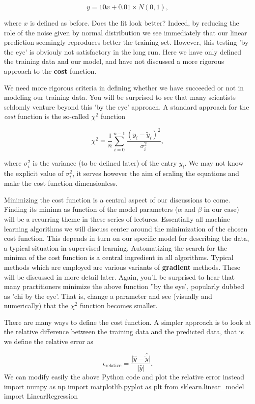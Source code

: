 \documentclass[%
oneside,                 %
final,                   %
10pt]{article}
\begin{document}
\[
y = 10x+0.01 \times N(0,1),
\]

where $x$ is defined as before.  Does the fit look better? Indeed, by
reducing the role of the noise given by normal distribution we see immediately that
our linear prediction seemingly reproduces better the training
set. However, this testing 'by the eye' is obviouly not satisfactory in the
long run. Here we have only defined the training data and our model, and 
have not discussed a more rigorous approach to the \textbf{cost} function.

We need more rigorous criteria in defining whether we have succeeded or
not in modeling our training data.  You will be surprised to see that
many scientists seldomly venture beyond this 'by the eye' approach. A
standard approach for the \emph{cost} function is the so-called $\chi^2$
function 

\[ \chi^2 = \frac{1}{n}
\sum_{i=0}^{n-1}\frac{(y_i-\tilde{y}_i)^2}{\sigma_i^2}, 
\] 

where $\sigma_i^2$ is the variance (to be defined later) of the entry
$y_i$.  We may not know the explicit value of $\sigma_i^2$, it serves
however the aim of scaling the equations and make the cost function
dimensionless.  

Minimizing the cost function is a central aspect of
our discussions to come. Finding its minima as function of the model
parameters ($\alpha$ and $\beta$ in our case) will be a recurring
theme in these series of lectures. Essentially all machine learning
algorithms we will discuss center around the minimization of the
chosen cost function. This depends in turn on our specific
model for describing the data, a typical situation in supervised
learning. Automatizing the search for the minima of the cost function is a
central ingredient in all algorithms. Typical methods which are
employed are various variants of \textbf{gradient} methods. These will be
discussed in more detail later. Again, you'll be surprised to hear that
many practitioners minimize the above function ''by the eye', popularly dubbed as 
'chi by the eye'. That is, change a parameter and see (visually and numerically) that 
the  $\chi^2$ function becomes smaller. 

There are many ways to define the cost function. A simpler approach is to look at the relative difference between the training data and the predicted data, that is we define 
the relative error as

\[
\epsilon_{\mathrm{relative}}= \frac{\vert \hat{y} -\hat{\tilde{y}}\vert}{\vert \hat{y}\vert}.
\]
We can modify easily the above Python code and plot the relative error instead
\bpycod
import numpy as np
import matplotlib.pyplot as plt
from sklearn.linear_model import LinearRegression
\end{document}
